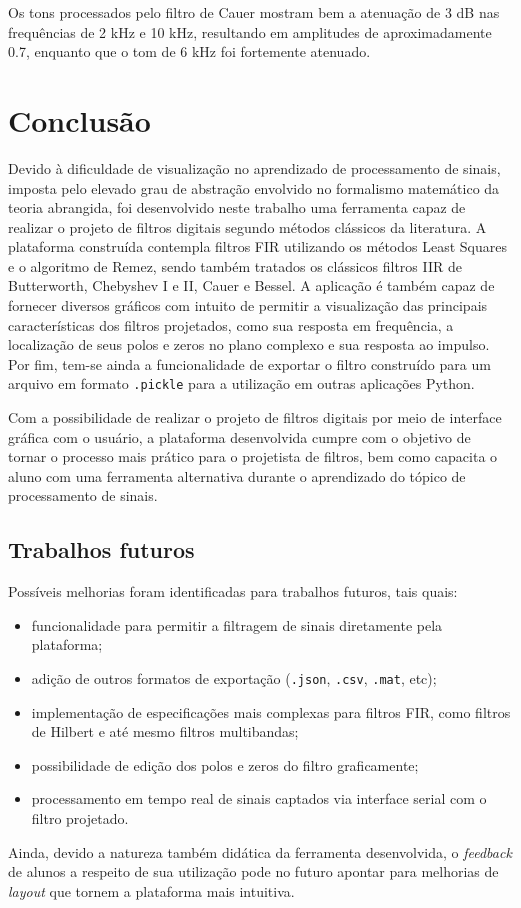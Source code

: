 \documentclass[12pt,a4paper]{report}
\begin{document}
  Os tons processados pelo filtro de Cauer mostram bem a atenuação de 3 dB nas frequências de 2 kHz e 10 kHz,
  resultando em amplitudes de aproximadamente 0.7, enquanto que o tom de 6 kHz foi fortemente atenuado.
  
\chapter{Conclusão}
  Devido à dificuldade de visualização no aprendizado de processamento de sinais, imposta pelo elevado grau de
  abstração envolvido no formalismo matemático da teoria abrangida, foi desenvolvido neste trabalho uma
  ferramenta capaz de realizar o projeto de filtros digitais segundo métodos clássicos da literatura.
  A plataforma construída contempla filtros FIR utilizando os métodos Least Squares e o algoritmo de Remez,
  sendo também tratados os clássicos filtros IIR de Butterworth, Chebyshev I e II, Cauer e Bessel. A aplicação é
  também capaz de fornecer diversos gráficos com intuito de permitir a visualização das principais
  características dos filtros projetados, como sua resposta em frequência, a localização de seus polos e zeros
  no plano complexo e sua resposta ao impulso. Por fim, tem-se ainda a funcionalidade de exportar o filtro
  construído para um arquivo em formato \texttt{.pickle} para a utilização em outras aplicações Python.

  Com a possibilidade de realizar o projeto de filtros digitais por meio de interface gráfica com o usuário,
  a plataforma desenvolvida cumpre com o objetivo de tornar o processo mais prático para o projetista de filtros,
  bem como capacita o aluno com uma ferramenta alternativa durante o aprendizado do tópico de processamento de
  sinais.

\section{Trabalhos futuros}
  Possíveis melhorias foram identificadas para trabalhos futuros, tais quais:

  \begin{itemize}
    \item funcionalidade para permitir a filtragem de sinais diretamente pela plataforma;
    \item adição de outros formatos de exportação (\texttt{.json}, \texttt{.csv}, \texttt{.mat}, etc);
    \item implementação de especificações mais complexas para filtros FIR, como filtros de Hilbert e até mesmo
      filtros multibandas;
    \item possibilidade de edição dos polos e zeros do filtro graficamente;
    \item processamento em tempo real de sinais captados via interface serial com o filtro projetado.
  \end{itemize}

  Ainda, devido a natureza também didática da ferramenta desenvolvida, o \textit{feedback} de alunos a respeito
  de sua utilização pode no futuro apontar para melhorias de \textit{layout} que tornem a plataforma mais
  intuitiva.

\printbibliography[heading=bibnumbered]
\end{document}
